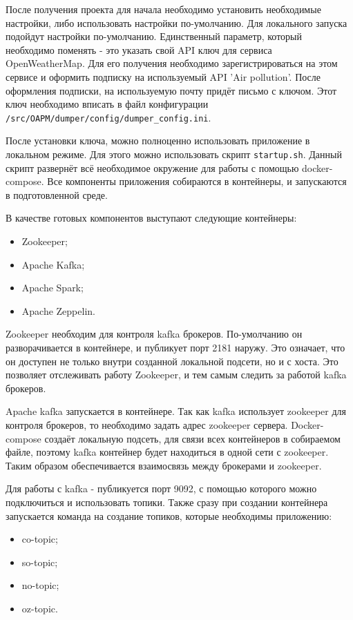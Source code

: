 После получения проекта для начала необходимо установить необходимые настройки, либо использовать настройки по-умолчанию.
Для локального запуска подойдут настройки по-умолчанию.
Единственный параметр, который необходимо поменять - это указать свой API ключ для сервиса OpenWeatherMap.
Для его получения необходимо зарегистрироваться на этом сервисе и оформить подписку на используемый API 'Air pollution'.
После оформления подписки, на используемую почту придёт письмо с ключом.
Этот ключ необходимо вписать в файл конфигурации \texttt{/src/OAPM/dumper/config/dumper\_config.ini}.

После установки ключа, можно полноценно использовать приложение в локальном режиме.
Для этого можно использовать скрипт \texttt{startup.sh}.
Данный скрипт развернёт всё необходимое окружение для работы с помощью docker-compose.
Все компоненты приложения собираются в контейнеры, и запускаются в подготовленной среде.

В качестве готовых компонентов выступают следующие контейнеры:
\begin{itemize}
    \item Zookeeper;
    \item Apache Kafka;
    \item Apache Spark;
    \item Apache Zeppelin.
\end{itemize}

Zookeeper необходим для контроля kafka брокеров.
По-умолчанию он разворачивается в контейнере, и публикует порт 2181 наружу.
Это означает, что он доступен не только внутри созданной локальной подсети, но и с хоста.
Это позволяет отслеживать работу Zookeeper, и тем самым следить за работой kafka брокеров.

Apache kafka запускается в контейнере.
Так как kafka использует zookeeper для контроля брокеров, то необходимо задать адрес zookeeper сервера.
Docker-compose создаёт локальную подсеть, для связи всех контейнеров в собираемом файле, поэтому kafka контейнер будет находиться в одной сети с zookeeper.
Таким образом обеспечивается взаимосвязь между брокерами и zookeeper.

Для работы с kafka - публикуется порт 9092, с помощью которого можно подключиться и использовать топики.
Также сразу при создании контейнера запускается команда на создание топиков, которые необходимы приложению:
\begin{itemize}
    \item co-topic;
    \item so-topic;
    \item no-topic;
    \item oz-topic.
\end{itemize}

